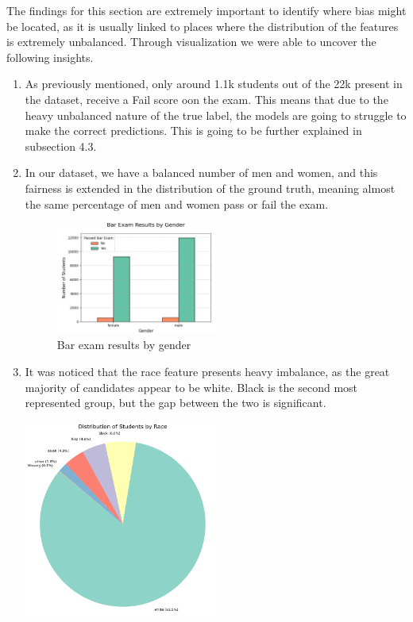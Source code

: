 \documentclass{article}
\begin{document}
The findings for this section are extremely important to identify where bias might be located, as it is usually linked to places where the distribution of the features is extremely unbalanced. Through visualization we were able to uncover the following insights. 
\begin{enumerate}
    \item As previously mentioned, only around 1.1k students out of the 22k present in the dataset, receive a Fail score oon the exam. This means that due to the heavy unbalanced nature of the true label, the models are going to struggle to make the correct predictions. This is going to be further explained in subsection 4.3.
    \item In our dataset, we have a balanced number of men and women, and this fairness is extended in the distribution of the ground truth, meaning almost the same percentage of men and women pass or fail the exam. 
    \begin{figure}[h!]
      \centering
      \includegraphics[width=0.5\textwidth]{bar_exam_results_gender.png} 
      \caption{Bar exam results by gender}
      \label{fig:example}
    \end{figure}
    \item It was noticed that the race feature presents heavy imbalance, as the great majority of candidates appear to be white. Black is the second most represented group, but the gap between the two is significant.
    \noindent
    \begin{center}
      \includegraphics[width=0.5\textwidth]{race_distribution.png}

\end{center}
\end{enumerate}
\end{document}
